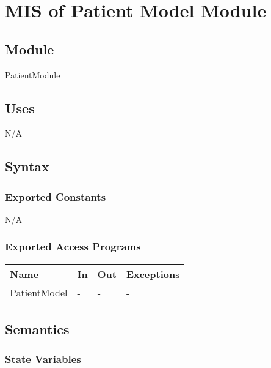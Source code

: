\documentclass[12pt, titlepage]{article}
\begin{document}
\newpage

\section{MIS of Patient Model Module } \label{Patient_Model_Module}

\subsection{Module}

PatientModule

\subsection{Uses}

N/A

\subsection{Syntax}

\subsubsection{Exported Constants}

N/A

\subsubsection{Exported Access Programs}

\begin{center}
\begin{tabular}{p{3cm} p{4cm} p{4cm} p{3.5cm}}
\hline
\textbf{Name} & \textbf{In} & \textbf{Out} & \textbf{Exceptions} \\
\hline
PatientModel & - & - & - \\ 
\hline
\end{tabular}
\end{center}

\subsection{Semantics}

\subsubsection{State Variables}
\end{document}
